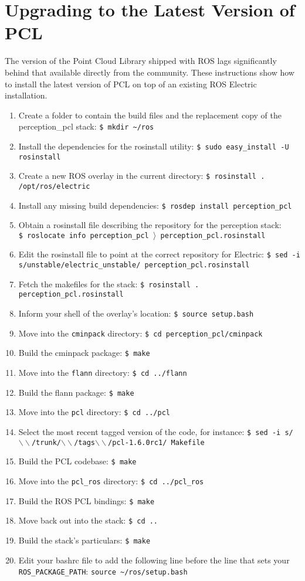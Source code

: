 \documentclass[12pt]{report}
\begin{document}
\section{Upgrading to the Latest Version of PCL}
The version of the Point Cloud Library shipped with ROS lags significantly behind that available directly from the community.  These instructions show how to install the latest version of PCL on top of an existing ROS Electric installation.
\begin{enumerate}
\item{Create a folder to contain the build files and the replacement copy of the perception\_pcl stack: \texttt{\$\ mkdir \~{}/ros}}
\item{Install the dependencies for the rosinstall utility: \texttt{\$\ sudo easy\_install -U rosinstall}}
\item{Create a new ROS overlay in the current directory: \texttt{\$\ rosinstall . /opt/ros/electric}}
\item{Install any missing build dependencies: \texttt{\$\ rosdep install perception\_pcl}}
\item{Obtain a rosinstall file describing the repository for the perception stack: \texttt{\$\ roslocate info perception\_pcl $\rangle$ perception\_pcl.rosinstall}}
\item{Edit the rosinstall file to point at the correct repository for Electric: \texttt{\$\ sed -i s/unstable/electric\_unstable/ perception\_pcl.rosinstall }}
\item{Fetch the makefiles for the stack: \texttt{\$\ rosinstall . perception\_pcl.rosinstall}}
\item{Inform your shell of the overlay's location: \texttt{\$\ source setup.bash}}
\item{Move into the \texttt{cminpack} directory: \texttt{\$\ cd perception\_pcl/cminpack}}
\item{Build the cminpack package: \texttt{\$\ make}}
\item{Move into the \texttt{flann} directory: \texttt{\$\ cd ../flann}}
\item{Build the flann package: \texttt{\$\ make}}
\item{Move into the \texttt{pcl} directory: \texttt{\$\ cd ../pcl}}
\item{Select the most recent tagged version of the code, for instance: \texttt{\$\ sed -i s/$\backslash\backslash$/trunk/$\backslash\backslash$/tags$\backslash\backslash$/pcl-1.6.0rc1/ Makefile}}
\item{Build the PCL codebase: \texttt{\$\ make}}
\item{Move into the \texttt{pcl\_ros} directory: \texttt{\$\ cd ../pcl\_ros}}
\item{Build the ROS PCL bindings: \texttt{\$\ make}}
\item{Move back out into the stack: \texttt{\$\ cd ..}}
\item{Build the stack's particulars: \texttt{\$\ make}}
\item{Edit your bashrc file to add the following line before the line that sets your \texttt{ROS\_PACKAGE\_PATH}: \texttt{source \~{}/ros/setup.bash}}
\end{enumerate}
\end{document}
